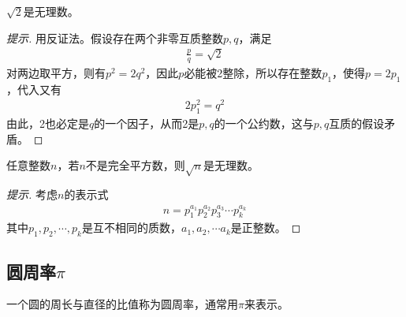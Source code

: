 \begin{example}
  $\sqrt2$是无理数。
\end{example}
\begin{proof}[提示]
  用反证法。假设存在两个非零互质整数$p,q$，满足
  \begin{align*}
    \frac{p}{q}=\sqrt2
  \end{align*}
  对两边取平方，则有$p^2=2q^2$，因此$p$必能被2整除，所以存在整数$p_1$，使得$p=2p_1$，代入又有
  \begin{align*}
    2p_1^2=q^2
  \end{align*}
  由此，2也必定是$q$的一个因子，从而2是$p,q$的一个公约数，这与$p,q$互质的假设矛盾。
\end{proof}

\begin{question}
  任意整数$n$，若$n$不是完全平方数，则$\sqrt n$是无理数。
\end{question}
\begin{proof}[提示]
  考虑$n$的表示式
  \begin{align*}
    n=p_1^{a_1} p_2^{a_2} p_3^{a_3} \cdots p_k^{a_k}
  \end{align*}
  其中$p_1,p_2,\cdots,p_k$是互不相同的质数，$a_1,a_2,\cdots a_k$是正整数。
\end{proof}


\subsection{圆周率$\pi$}
\label{sec:constant-pi}

一个圆的周长与直径的比值称为圆周率，通常用$\pi$来表示。

